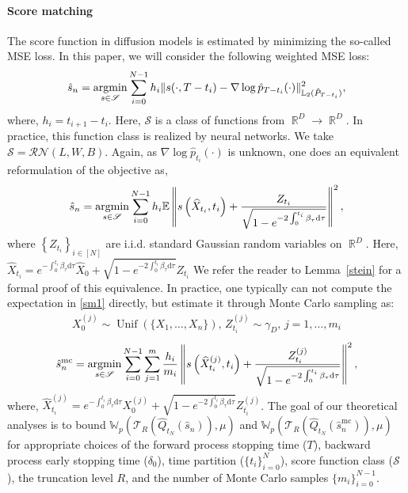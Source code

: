 \documentclass[12pts]{article}
\def\Real{\mathop{\mathbb{R}}\nolimits}
\def\argmin{\mathop{\rm argmin}}
\newcommand{\diff}{\mathrm{d}}
\newcommand{\cN}{ \mathcal{N}}
\newcommand{\cR}{ \mathcal{R}}
\newcommand{\sS}{ \mathscr{S}}
\newcommand{\sT}{ \mathscr{T}}
\newcommand{\hP}{ \hat{P}}
\newcommand{\hQ}{ \hat{Q}}
\newcommand{\hX}{ \widehat{X}}
\newcommand{\E}{\mathbb{E}}
\newcommand{\fL}{\mathbb{L}}
\newcommand{\fW}{\mathbb{W}}
\newcommand{\hp}{\hat{p}}
\begin{document}
\paragraph{Score matching} The score function in diffusion models is estimated by minimizing the so-called MSE loss. In this paper, we will consider the following weighted MSE loss:
\begin{align}
    \hat{s}_n = \argmin_{s \in \sS} \sum_{i=0}^{N-1} h_i \|s(\cdot, T-t_i) - \nabla \log \hp_{T-t_i}(\cdot)\|^2_{\fL_2(\hP_{T-t_i})}, \label{sm_1}
\end{align}
where, $h_i = t_{i+1} - t_{i}.$ Here, $\sS$ is a class of functions from $\Real^D \to \Real^D$. In practice, this function class is realized by neural networks. We take $\sS = \cR\cN(L, W, B)$. Again, as $\nabla \log \hp_{t_i}(\cdot)$ is unknown, one does an equivalent reformulation of the objective as,  
\begin{align}
    \hat{s}_n
    = \argmin_{s \in \sS} \sum_{i=0}^{N-1} h_i \E \left\| s\left(\hX_{t_i} , t_i\right) + \frac{Z_{t_i}}{\sqrt{1-e^{- 2\int_0^{t_i} \beta_\tau \diff  \tau}}}  \right\|^2 , \label{sm1}
\end{align}
where $\left\{Z_{t_i}\right\}_{i \in [N]}$ are i.i.d. standard Gaussian random variables on $\Real^D$. Here, $\hX_{t_i} = e^{-\int_0^{t_i} \beta_\tau \diff  \tau } \hX_0 + \sqrt{1-e^{- 2\int_0^{t_i} \beta_\tau \diff  \tau}} Z_{t_i}$ We refer the reader to Lemma~\ref{stein} for a formal proof of this equivalence. In practice, one typically can not compute the expectation in \eqref{sm1} directly, but estimate it through Monte Carlo sampling as:
\begin{align*}
    X_{0}^{(j)} \sim \operatorname{Unif}\left(\{X_1, \dots , X_n\}\right) , \, Z^{(j)}_{t_i} \sim \gamma_D, \, j = 1, \dots, m_i
\end{align*}
\begin{align}
    \hat{s}^{\mathrm{mc}}_n
    = \argmin_{s \in \sS}   \sum_{i=0}^{N-1}  \sum_{j=1}^m \frac{h_i}{ m_i} \left\| s\left(\hX_{t_i}^{(j)} , t_i\right) + \frac{Z_{t_i}^{(j)}}{\sqrt{1-e^{- 2\int_0^{t_i} \beta_\tau \diff  \tau}}}  \right\|^2 , \label{sm2}
\end{align} 
where, $\hX_{t_i}^{(j)} = e^{-\int_0^{t_i} \beta_\tau \diff  \tau } X_{0}^{(j)} + \sqrt{1-e^{- 2\int_0^{t_i} \beta_\tau \diff  \tau}} Z_{t_i}^{(j)}$. The goal of our theoretical analyses is to bound $\fW_p(\sT_R(\hQ_{t_N}(\hat{s}_n)), \mu)$ and $\fW_p(\sT_R(\hQ_{t_N}(\hat{s}^{\mathrm{mc}}_n)), \mu)$ for appropriate choices of the forward process stopping time ($T$), backward process early stopping time ($\delta_0$), time partition ($\{t_i\}_{i=0}^N$), score function class ($\sS$),  the truncation level $R$, and the number of Monte Carlo samples $\{m_i\}_{i=0}^{N-1}$.
\end{document}
